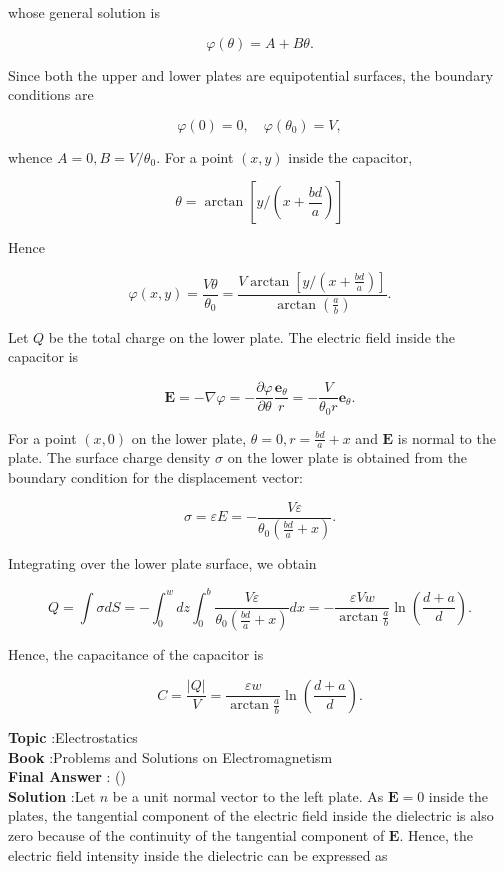 \documentclass[10pt]{article}
\begin{document}
whose general solution is

$$
\varphi(\theta)=A+B \theta .
$$

Since both the upper and lower plates are equipotential surfaces, the boundary conditions are

$$
\varphi(0)=0, \quad \varphi\left(\theta_{0}\right)=V,
$$

whence $A=0, B=V / \theta_{0}$. For a point $(x, y)$ inside the capacitor,

$$
\theta=\arctan \left[y /\left(x+\frac{b d}{a}\right)\right]
$$

Hence

$$
\varphi(x, y)=\frac{V \theta}{\theta_{0}}=\frac{V \arctan \left[y /\left(x+\frac{b d}{a}\right)\right]}{\arctan \left(\frac{a}{b}\right)} .
$$

 Let $Q$ be the total charge on the lower plate. The electric field inside the capacitor is

$$
\mathbf{E}=-\nabla \varphi=-\frac{\partial \varphi}{\partial \theta} \frac{\mathbf{e}_{\theta}}{r}=-\frac{V}{\theta_{0} r} \mathbf{e}_{\theta} .
$$

For a point $(x, 0)$ on the lower plate, $\theta=0, r=\frac{b d}{a}+x$ and $\mathbf{E}$ is normal to the plate. The surface charge density $\sigma$ on the lower plate is obtained from the boundary condition for the displacement vector:

$$
\sigma=\varepsilon E=-\frac{V \varepsilon}{\theta_{0}\left(\frac{b d}{a}+x\right)} .
$$

Integrating over the lower plate surface, we obtain

$$
Q=\int \sigma d S=-\int_{0}^{w} d z \int_{0}^{b} \frac{V \varepsilon}{\theta_{0}\left(\frac{b d}{a}+x\right)} d x=-\frac{\varepsilon V w}{\arctan \frac{a}{b}} \ln \left(\frac{d+a}{d}\right) .
$$

Hence, the capacitance of the capacitor is

$$
C=\frac{|Q|}{V}=\frac{\varepsilon w}{\arctan \frac{a}{b}} \ln \left(\frac{d+a}{d}\right) .
$$



\textbf{Topic} :Electrostatics\\
\textbf{Book} :Problems and Solutions on Electromagnetism\\
\textbf{Final Answer} : \ln \left(\right)\\


\textbf{Solution} :Let $n$ be a unit normal vector to the left plate. As $\mathbf{E}=0$ inside the plates, the tangential component of the electric field inside the dielectric is also zero because of the continuity of the tangential component of $\mathbf{E}$. Hence, the electric field intensity inside the dielectric can be expressed as
\end{document}
